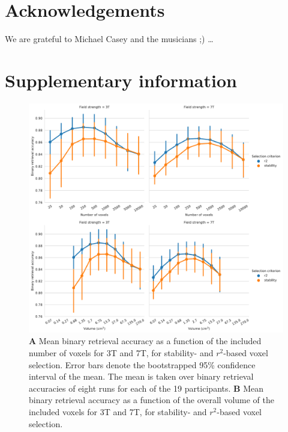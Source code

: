 \section*{Acknowledgements}

We are grateful to Michael Casey and the musicians ;) \ldots




\beginsupplement
\section*{Supplementary information} \label{supplemental}
\begin{figure}
  \centering
  \includegraphics[width=\linewidth]{pics/binary_selection.pdf}
	
  \caption{\textbf{A} Mean binary retrieval accuracy as a function of the
  included number of voxels for 3T and 7T, for stability- and $r^2$-based
  voxel selection. Error bars denote the bootstrapped 95\% confidence interval
  of the mean. The mean is taken over binary retrieval accuracies of eight runs
  for each of the 19 participants. \textbf{B} Mean binary retrieval accuracy as
a function of the overall volume of the included voxels for 3T and 7T, for
stability- and $r^2$-based voxel selection.
}

 \label{fig:binary_retrieval_selection}\end{figure}

